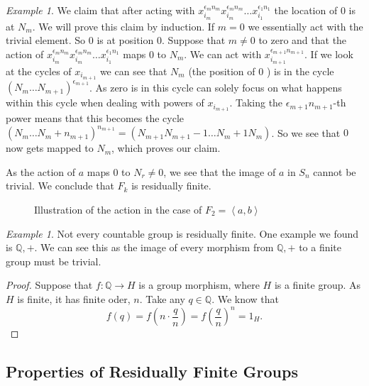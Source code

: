 \documentclass[titlepage, a4paper]{article}
\newcommand{\Q}{\mathbb{Q}}
\theoremstyle{theoremdd}
\theoremstyle{definition}
\theoremstyle{remark}
\newtheorem{example}[theorem]{Example}
\begin{document}
\begin{example}
We claim that after acting with $x_{i_{m}}^{\epsilon_{m}n_{m}}x_{i_{m}}^{\epsilon_{m}n_{m}} \ldots x_{i_1}^{\epsilon_1n_1}$ the location of  $0$ is at $N_m$.
We will prove this claim by induction.
If  $m=0$ we essentially act with the trivial element. So $0$ is at position $0$.
 Suppose that $m \ne 0$ to zero and that the action of $x_{i_{m}}^{\epsilon_{m}n_{m}}x_{i_{m}}^{\epsilon_{m}n_{m}} \ldots x_{i_1}^{\epsilon_1n_1}$ maps $0$ to $N_m$. 
 We can act with  $x_{i_{m+1}}^{\epsilon_{m+1}n_{m+1}}$. 
 If we look at the cycles of $x_{i_{m+1}}$ we can see that $N_m$ (the position of  $0$ ) is in the cycle $(N_m \ldots N_{m+1})^{\epsilon_{m+1}}$. As zero is in this cycle can solely focus on what happens within this cycle when dealing with powers of $x_{i_{m+1}}$. 
 Taking the $\epsilon _{m+1} n_{m+1}$-th power means that this becomes the cycle $(N_m \ldots N_{m} + n_{m+1})^{n_{m+1}} = (N_{m+1} N_{m+1}-1 \ldots N_m + 1 N_m)$. 
So we see that $0$ now gets mapped to $N_m$, which proves our claim.

As the action of  $a$ maps $0$ to $N_r \ne 0$, we see that the image of  $a$ in  $S_n$ cannot be trivial. 
We conclude that $F_k$ is residually finite.

\begin{figure}[ht]
	\centering
	
	\caption{Illustration of the action in the case of $F_2 = \left<a,b \right>$}
	\label{fig:}
\end{figure}

\end{example}

\begin{example}
	Not every countable group is residually finite. One example we found is $\Q, +$.
	We can see this as the image of every morphism from $\Q, +$ to a finite group must be trivial. 
	\begin{proof}
		Suppose that $f:\Q \to H$ is a group morphism, where $H$ is a finite group. 
		As $H$ is finite, it has finite oder, $n$.
		Take any $q \in \Q$. 
		We know that  \[
			f(q) = f\left(n\cdot \frac{q}{n}\right) = f\left(\frac{q}{n}\right)^{n} = 1_H
		.\] 
	\end{proof}
\end{example}



\subsection{Properties of Residually Finite Groups}
\end{document}
